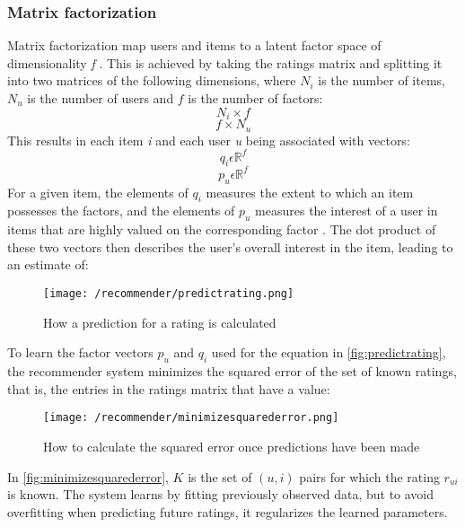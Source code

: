 \subsubsection{Matrix factorization}
Matrix factorization map users and items to a latent factor space of dimensionality \textit{f} \cite{MatrixFactorization}. 
This is achieved by taking the ratings matrix and splitting it into two matrices of the following dimensions, where $N_{i}$ is the number of items, $N_{u}$ is the number of users and $f$ is the number of factors:
\begin{equation}
    N_{i} \times f
\end{equation} 
\begin{equation}
    f \times N_{u}
\end{equation}
This results in each item \textit{i} and each user \textit{u} being associated with vectors: 
\begin{equation}
    q_{i} \epsilon \mathbb{R}^f
\end{equation}
\begin{equation}
    p_{u} \epsilon \mathbb{R}^f
\end{equation}
For a given item, the elements of $q_{i}$ measures the extent to which an item possesses the factors, and the elements of $p_{u}$ measures the interest of a user in items that are highly valued on the corresponding factor \cite{MatrixFactorization}.
The dot product of these two vectors then describes the user's overall interest in the item, leading to an estimate of:
\begin{figure}[H]
    \centering
    \texttt{[image: /recommender/predictrating.png]}
     \caption{How a prediction for a rating is calculated}
     \label{fig:predictrating}
 \end{figure}
 \noindent
To learn the factor vectors $p_{u}$ and $q_{i}$ used for the equation in \autoref{fig:predictrating}, the recommender system minimizes the squared error of the set of known ratings, that is, the entries in the ratings matrix that have a value:
 \begin{figure}[H]
    \centering
    \texttt{[image: /recommender/minimizesquarederror.png]}
     \caption{How to calculate the squared error once predictions have been made}
     \label{fig:minimizesquarederror}
 \end{figure}
 \noindent
 In \autoref{fig:minimizesquarederror}, $K$ is the set of $(u, i)$ pairs for which the rating $r_{ui}$ is known.
 The system learns by fitting previously observed data, but to avoid overfitting when predicting future ratings, it regularizes the learned parameters.
